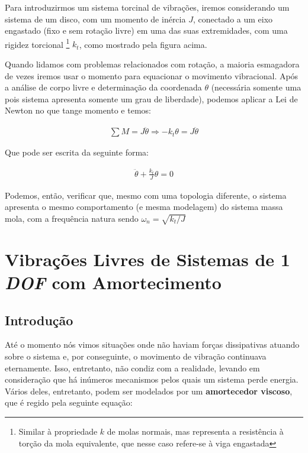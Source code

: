 \documentclass{article}
\begin{document}
                Para introduzirmos um sistema torcinal de vibrações, iremos considerando um sistema de um disco, com um momento de inércia $J$, conectado a um eixo engastado (fixo e sem rotação livre) em uma das suas extremidades, com uma rigidez torcional
                \footnote{Similar à propriedade $k$ de molas normais, mas representa a resistência à torção da mola equivalente, que nesse caso refere-se à viga engastada}
                $k_t$, como mostrado pela figura acima. 

                Quando lidamos com problemas relacionados com rotação, a maioria esmagadora de vezes iremos usar o momento para equacionar o movimento vibracional. Após a análise de corpo livre e
                determinação da coordenada $\theta$ (necessária somente uma pois sistema apresenta somente um grau de liberdade), podemos aplicar a Lei de Newton no que tange momento e temos:

                \begin{align*}
                    \sum M = J \ddot \theta \Rightarrow -k_t\theta = J \ddot \theta
                \end{align*}

                Que pode ser escrita da seguinte forma:

                \begin{align}
                    \ddot\theta + \frac{k_t}{J}\theta = 0 \label{eq:som_moments_sis_torcional}
                \end{align}

                Podemos, então, verificar que, mesmo com uma topologia diferente, o sistema apresenta o mesmo comportamento (e mesma modelagem) do sistema massa mola, com a frequência natura sendo 
                $\omega_n = \sqrt{k_t/J}$

        \section{Vibrações Livres de Sistemas de 1 \emph{DOF} com Amortecimento}

            \subsection{Introdução}
                Até o momento nós vimos situações onde não haviam forças dissipativas atuando sobre o sistema e, por conseguinte, o movimento de vibração continuava eternamente. Isso, entretanto, não
                condiz com a realidade, levando em consideração que há inúmeros mecanismos pelos quais um sistema perde energia. Vários deles, entretanto, podem ser modelados por um 
                \textbf{amortecedor viscoso}, que é regido pela seguinte equação:
\end{document}
